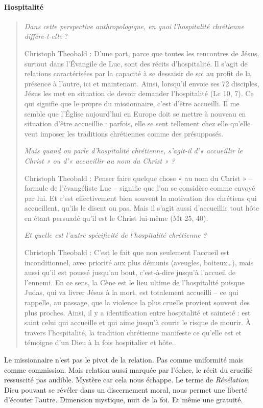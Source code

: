 \paragraph{Hospitalité}
\begin{quote}
 \textit{Dans cette perspective anthropologique, en quoi l’hospitalité chrétienne diffère-t-elle }?    
 
 
Christoph Theobald : D’une part, parce que toutes les rencontres de Jésus, surtout dans l’Évangile de Luc, sont des récits d’hospitalité. Il s’agit de relations caractérisées par la capacité à se dessaisir de soi au profit de la présence à l’autre, ici et maintenant. Ainsi, lorsqu’il envoie ses 72 disciples, Jésus les met en situation de devoir demander l’hospitalité (Lc 10, 7). Ce qui signifie que le propre du missionnaire, c’est d’être accueilli. Il me semble que l’Église aujourd’hui en Europe doit se mettre à nouveau en situation d’être accueillie : parfois, elle se sent tellement chez elle qu’elle veut imposer les traditions chrétiennes comme des présupposés.

\textit{Mais quand on parle d’hospitalité chrétienne, s’agit-il d’« accueillir le Christ » ou d’« accueillir au nom du Christ » ?}


Christoph Theobald : Penser faire quelque chose « au nom du Christ » – formule de l’évangéliste Luc – signifie que l’on se considère comme envoyé par lui. Et c’est effectivement bien souvent la motivation des chrétiens qui accueillent, qu’ils le disent ou pas. Mais il s’agit aussi d’accueillir tout hôte en étant persuadé qu’il est le Christ lui-même (Mt 25, 40).

\textit{Et quelle est l’autre spécificité de l’hospitalité chrétienne ?}


Christoph Theobald : C’est le fait que non seulement l’accueil est inconditionnel, avec priorité aux plus démunis (aveugles, boiteux…), mais aussi qu’il est poussé jusqu’au bout, c’est-à-dire jusqu’à l’accueil de l’ennemi. En ce sens, la Cène est le lieu ultime de l’hospitalité puisque Judas, qui va livrer Jésus à la mort, est totalement accueilli – ce qui rappelle, au passage, que la violence la plus cruelle provient souvent des plus proches. Ainsi, il y a identification entre hospitalité et sainteté : est saint celui qui accueille et qui aime jusqu’à courir le risque de mourir. À travers l’hospitalité, la tradition chrétienne manifeste ce qu’elle est et témoigne d’un Dieu à la fois hospitalier et hôte.. 
\end{quote}
Le missionnaire n’est pas le pivot de la relation. Pas comme uniformité mais comme commission. Mais relation aussi marquée par l’échec, le récit du crucifié ressuscité pas audible. Mystère car cela nous échappe. 
Le terme de \textit{Révélation}, Dieu pouvant se révéler dans un discernement moral, nous permet une liberté d'écouter l'autre. Dimension mystique, nuit de la foi. Et même une gratuité. 


